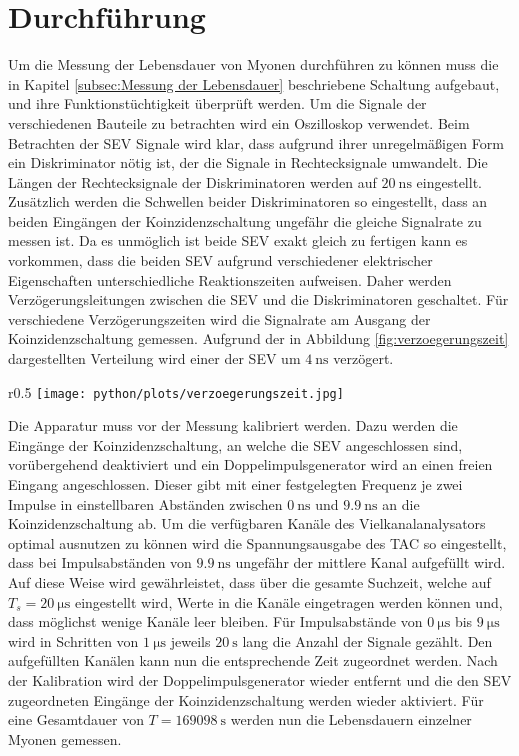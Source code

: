 \section{Durchführung}
\label{sec:Durchführung}
Um die Messung der Lebensdauer von Myonen durchführen zu können muss die in Kapitel \ref{subsec:Messung der Lebensdauer} beschriebene Schaltung aufgebaut, und ihre Funktionstüchtigkeit überprüft werden.
Um die Signale der verschiedenen Bauteile zu betrachten wird ein Oszilloskop verwendet.
Beim Betrachten der SEV Signale wird klar, dass aufgrund ihrer unregelmäßigen Form ein Diskriminator nötig ist, der die Signale in Rechtecksignale umwandelt.
Die Längen der Rechtecksignale der Diskriminatoren werden auf $\SI{20}{\nano\second}$ eingestellt.
Zusätzlich werden die Schwellen beider Diskriminatoren so eingestellt, dass an beiden Eingängen der Koinzidenzschaltung ungefähr die gleiche Signalrate zu messen ist.
Da es unmöglich ist beide SEV exakt gleich zu fertigen kann es vorkommen, dass die beiden SEV aufgrund verschiedener elektrischer Eigenschaften unterschiedliche Reaktionszeiten aufweisen.
Daher werden Verzögerungsleitungen zwischen die SEV und die Diskriminatoren geschaltet.
Für verschiedene Verzögerungszeiten wird die Signalrate am Ausgang der Koinzidenzschaltung gemessen.
Aufgrund der in Abbildung \ref{fig:verzoegerungszeit} dargestellten Verteilung wird einer der SEV um $\SI{4}{\nano\second}$ verzögert.
\begin{wrapfigure}{r}{0.5\textwidth}
\centering
\texttt{[image: python/plots/verzoegerungszeit.jpg]}
\caption{Zählergebnis am Ausgang der Koinzidenzschaltung für verschiedene Verzögerungszeiten $t$. Die Messzeit beträgt $\SI{10}{\second}$ für jeden Messwert.
}
\label{fig:verzoegerungszeit}
\end{wrapfigure}
Die Apparatur muss vor der Messung kalibriert werden.
Dazu werden die Eingänge der Koinzidenzschaltung, an welche die SEV angeschlossen sind, vorübergehend deaktiviert und ein Doppelimpulsgenerator wird an einen freien Eingang angeschlossen.
Dieser gibt mit einer festgelegten Frequenz je zwei Impulse in einstellbaren Abständen zwischen $\SI{0}{\nano\second}$ und $\SI{9.9}{\nano\second}$ an die Koinzidenzschaltung ab.
Um die verfügbaren Kanäle des Vielkanalanalysators optimal ausnutzen zu können wird die Spannungsausgabe des TAC so eingestellt, dass bei Impulsabständen von $\SI{9.9}{\nano\second}$ ungefähr der mittlere Kanal aufgefüllt wird.
Auf diese Weise wird gewährleistet, dass über die gesamte Suchzeit, welche auf $T_s=\SI{20}{\micro\second}$ eingestellt wird, Werte in die Kanäle eingetragen werden können und, dass möglichst wenige Kanäle leer bleiben.
Für Impulsabstände von $\SI{0}{\micro\second}$ bis $\SI{9}{\micro\second}$ wird in Schritten von $\SI{1}{\micro\second}$ jeweils $\SI{20}{\second}$ lang die Anzahl der Signale gezählt.
Den aufgefüllten Kanälen kann nun die entsprechende Zeit zugeordnet werden.
Nach der Kalibration wird der Doppelimpulsgenerator wieder entfernt und die den SEV zugeordneten Eingänge der Koinzidenzschaltung werden wieder aktiviert.
Für eine Gesamtdauer von $T=\SI{169098}{\second}$ werden nun die Lebensdauern einzelner Myonen gemessen.